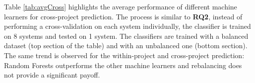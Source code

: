 \begin{table}[t]
	\caption{Average performance of different machine learners for cross-project prediction.}
	\label{tab:avgCross}
	\centering\tiny
	\vspace{-3mm}
\end{table}

Table \ref{tab:avgCross} highlights the average performance of different machine learners for cross-project prediction. The process is similar to \textbf{RQ2}, instead of performing a cross-validation on each system individually, the classifier is trained on 8 systems and tested on 1 system. The classifiers are trained with a balanced dataset (top section of the table) and with an unbalanced one (bottom section). The same trend is observed for the within-project and cross-project prediction: Random Forests outperforms the other machine learners and rebalancing does not provide a significant payoff. 

